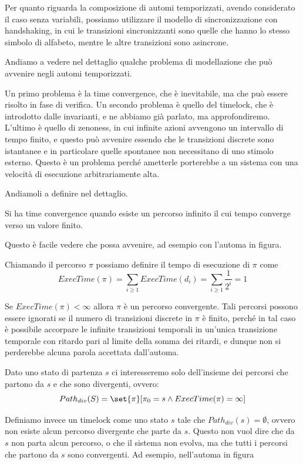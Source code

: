 Per quanto riguarda la composizione di automi temporizzati, avendo considerato il caso senza variabili, possiamo utilizzare il modello di sincronizzazione con handshaking, in cui le transizioni sincronizzanti sono quelle che hanno lo stesso simbolo di alfabeto, mentre le altre transizioni sono asincrone.

Andiamo a vedere nel dettaglio qualche problema di modellazione che può avvenire negli automi temporizzati.

Un primo problema è la time convergence, che è inevitabile, ma che può essere risolto in fase di verifica.
Un secondo problema è quello del timelock, che è introdotto dalle invarianti, e ne abbiamo già parlato, ma approfondiremo.
L'ultimo è quello di zenoness, in cui infinite azioni avvengono un intervallo di tempo finito, e questo può avvenire essendo che le transizioni discrete sono istantanee e in particolare quelle spontanee non necessitano di uno stimolo esterno. Questo è un problema perché ametterle porterebbe a un sistema con una velocità di esecuzione arbitrariamente alta.

Andiamoli a definire nel dettaglio.

Si ha time convergence quando esiste un percorso infinito il cui tempo converge verso un valore finito.

Questo è facile vedere che possa avvenire, ad esempio con l'automa in figura.

Chiamando il percorso \(\pi\) possiamo definire il tempo di esecuzione di \(\pi\) come
\[ExecTime(\pi) = \sum_{i \geq 1} ExecTime(d_i) = \sum_{i \geq 1} \frac{1}{2^i} = 1\]

Se \(ExecTime(\pi)<\infty\) allora \(\pi\) è un percorso convergente. Tali percorsi possono essere ignorati se il numero di transizioni discrete in \(\pi\) è finito, perché in tal caso è possibile accorpare le infinite transizioni temporali in un'unica transizione temporale con ritardo pari al limite della somma dei ritardi, e dunque non si perderebbe alcuna parola accettata dall'automa.

Dato uno stato di partenza \(s\) ci interesseremo solo dell'insieme dei percorsi che partono da \(s\) e che sono divergenti, ovvero:
\[Path_{div}(S) = \set{\pi}[\pi_0 = s \land ExecTime(\pi) =\infty]\]

Definiamo invece un timelock come uno stato \(s\) tale che \(Path_{div}(s) = \emptyset\), ovvero non esiste alcun percorso divergente che parte da \(s\). Questo non vuol dire che da \(s\) non parta alcun percorso, o che il sistema non evolva, ma che tutti i percorsi che partono da \(s\) sono convergenti. Ad esempio, nell'automa in figura

